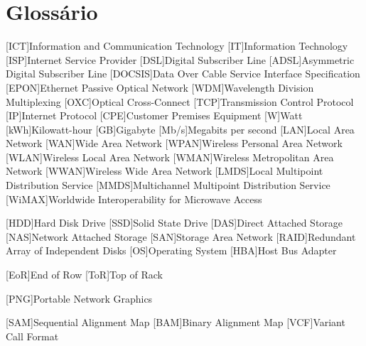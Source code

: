 \chapter{Glossário}

\footnotesize
\SingleSpacing

\begin{multicols}{2}
\begin{acronym}[AAAAAA]

	[ICT]{Information and Communication Technology}
	[IT]{Information Technology}
	[ISP]{Internet Service Provider}
	[DSL]{Digital Subscriber Line}
	[ADSL]{Asymmetric Digital Subscriber Line}
	[DOCSIS]{Data Over Cable Service Interface Specification}
	[EPON]{Ethernet Passive Optical Network}
	[WDM]{Wavelength Division Multiplexing}
	[OXC]{Optical Cross-Connect}
	[TCP]{Transmission Control Protocol}
	[IP]{Internet Protocol}
	[CPE]{Customer Premises Equipment}
	{Watt}
	[kWh]{Kilowatt-hour}
	[GB]{Gigabyte}
	[Mb/s]{Megabits per second}
	[LAN]{Local Area Network}
	[WAN]{Wide Area Network}
	[WPAN]{Wireless Personal Area Network}
	[WLAN]{Wireless Local Area Network}
	[WMAN]{Wireless Metropolitan Area Network}
	[WWAN]{Wireless Wide Area Network}
	[LMDS]{Local Multipoint Distribution Service}
	[MMDS]{Multichannel Multipoint Distribution Service}
	[WiMAX]{Worldwide Interoperability for Microwave Access}

	[HDD]{Hard Disk Drive}
	[SSD]{Solid State Drive}
	[DAS]{Direct Attached Storage}
	[NAS]{Network Attached Storage}
	[SAN]{Storage Area Network}
	[RAID]{Redundant Array of Independent Disks}
	[OS]{Operating System}
	[HBA]{Host Bus Adapter}

	[EoR]{End of Row}
	[ToR]{Top of Rack}

	[PNG]{Portable Network Graphics}

	[SAM]{Sequential Alignment Map}
	[BAM]{Binary Alignment Map}
	[VCF]{Variant Call Format}


\end{acronym}
\end{multicols}

